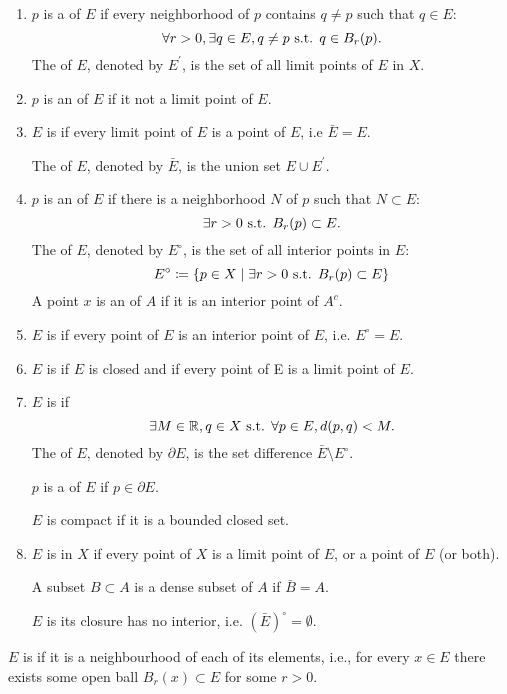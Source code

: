 \begin{definition}
\begin{enumerate}[label=(\arabic*)]
\item $p$ is a  of $E$ if every neighborhood of $p$ contains $q\neq p$ such that $q\in E$:
\[ \forall r>0,\exists q\in E, q\neq p\text{ s.t. } q\in B_r(p). \]
The  of $E$, denoted by $E^\prime$, is the set of all limit points of $E$ in $X$.
\item $p$ is an  of $E$ if it not a limit point of $E$.
\item $E$ is  if every limit point of $E$ is a point of $E$, i.e $\bar{E}=E$.

The  of $E$, denoted by $\bar{E}$, is the union set $E\cup E^\prime$.

\item $p$ is an  of $E$ if there is a neighborhood $N$ of $p$ such that $N\subset E$:
\[ \exists r>0 \text{ s.t. } B_r(p)\subset E. \]
The  of $E$, denoted by $E^\circ$, is the set of all interior points in $E$:
\[E^\circ\coloneqq\{p\in X\mid \exists r>0 \text{ s.t. } B_r(p)\subset E\}\]
A point $x$ is an  of $A$ if it is an interior point of $A^c$.
\item $E$ is  if every point of $E$ is an interior point of $E$, i.e. $E^\circ=E$.
\item $E$ is  if $E$ is closed and if every point of E is a limit point of $E$.
\item $E$ is  if 
\[ \exists M\in\mathbb R, q\in X\text{ s.t. }\forall p\in E, d(p,q)<M. \]
The  of $E$, denoted by $\partial E$, is the set difference $\bar{E}\setminus E^\circ$.

$p$ is a  of $E$ if $p\in\partial E$.

$E$ is compact if it is a bounded closed set.
\item $E$ is  in $X$ if every point of $X$ is a limit point of $E$, or a point of $E$ (or both). 

A subset $B\subset A$ is a dense subset of $A$ if $\bar{B}=A$.

$E$ is  its closure has no interior, i.e. $(\bar{E})^\circ=\emptyset$.
\end{enumerate}
\end{definition}

\begin{definition}
$E$ is  if it is a neighbourhood of each of its elements, i.e., for every $x\in E$ there exists some open ball $B_r(x)\subset E$ for some $r>0$.
\end{definition}

